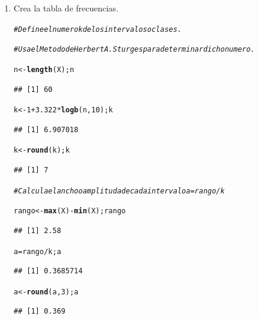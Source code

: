 \documentclass[12pt,letterpaper]{article}\usepackage[]{graphicx}\usepackage[]{color}
\makeatletter
\newcommand{\hlnum}[1]{\textcolor[rgb]{0.686,0.059,0.569}{#1}}%
\newcommand{\hlcom}[1]{\textcolor[rgb]{0.678,0.584,0.686}{\textit{#1}}}%
\newcommand{\hlopt}[1]{\textcolor[rgb]{0,0,0}{#1}}%
\newcommand{\hlstd}[1]{\textcolor[rgb]{0.345,0.345,0.345}{#1}}%
\newcommand{\hlkwb}[1]{\textcolor[rgb]{0.69,0.353,0.396}{#1}}%
\newcommand{\hlkwd}[1]{\textcolor[rgb]{0.737,0.353,0.396}{\textbf{#1}}}%
\newenvironment{kframe}{%
 \def\at@end@of@kframe{}%
 \ifinner\ifhmode%
  \def\at@end@of@kframe{\end{minipage}}%
  \begin{minipage}{\columnwidth}%
 \fi\fi%
 \def\FrameCommand##1{\hskip\@totalleftmargin \hskip-\fboxsep
 \colorbox{shadecolor}{##1}\hskip-\fboxsep
     \hskip-\linewidth \hskip-\@totalleftmargin \hskip\columnwidth}%
 \MakeFramed {\advance\hsize-\width
   \@totalleftmargin\z@ \linewidth\hsize
   \@setminipage}}%
 {\par\unskip\endMakeFramed%
 \at@end@of@kframe}
\newenvironment{knitrout}{}{} %
\makeatother
\begin{document}
\begin{enumerate}
\item Crea la tabla de frecuencias.
\begin{knitrout}
\color{fgcolor}\begin{kframe}
\begin{alltt}
\hlcom{# Define el numero k de los intervalos o clases. }

\hlcom{# Usa el Metodo de Herbert A. Sturges para determinar dicho numero.}

\hlstd{n} \hlkwb{<-} \hlkwd{length}\hlstd{(X); n}
\end{alltt}
\begin{verbatim}
## [1] 60
\end{verbatim}
\begin{alltt}
\hlstd{k} \hlkwb{<-} \hlnum{1}\hlopt{+}\hlnum{3.322}\hlopt{*}\hlkwd{logb}\hlstd{(n,} \hlnum{10}\hlstd{); k}
\end{alltt}
\begin{verbatim}
## [1] 6.907018
\end{verbatim}
\begin{alltt}
\hlstd{k} \hlkwb{<-} \hlkwd{round}\hlstd{(k); k}
\end{alltt}
\begin{verbatim}
## [1] 7
\end{verbatim}
\end{kframe}
\end{knitrout}

\begin{knitrout}
\color{fgcolor}\begin{kframe}
\begin{alltt}
\hlcom{# Calcula el ancho o amplitud a de cada intervalo a=rango/k}

\hlstd{rango} \hlkwb{<-} \hlkwd{max}\hlstd{(X)}\hlopt{-}\hlkwd{min}\hlstd{(X); rango}
\end{alltt}
\begin{verbatim}
## [1] 2.58
\end{verbatim}
\begin{alltt}
\hlstd{a}\hlkwb{=}\hlstd{rango}\hlopt{/}\hlstd{k; a}
\end{alltt}
\begin{verbatim}
## [1] 0.3685714
\end{verbatim}
\begin{alltt}
\hlstd{a} \hlkwb{<-} \hlkwd{round}\hlstd{(a,} \hlnum{3}\hlstd{); a}
\end{alltt}
\begin{verbatim}
## [1] 0.369
\end{verbatim}
\end{kframe}
\end{knitrout}


\end{enumerate}
\end{document}
